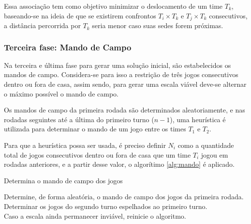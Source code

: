 \documentclass[12pt,a4paper]{article}
\makeatletter
\newcommand{\algorithmfootnote}[2][\footnotesize]{%
	\let\old@algocf@finish\@algocf@finish%
	\def\@algocf@finish{\old@algocf@finish%
		\leavevmode\rlap{\begin{minipage}{\linewidth}
				#1#2
		\end{minipage}}%
	}%
}
\makeatother
\begin{document}
Essa associação tem como objetivo minimizar o deslocamento de um time $T_{k}$, baseando-se na ideia de que se existirem confrontos $T_{i} \times T_{k}$ e $T_{j} \times T_{k}$ consecutivos, a distância percorrida por $T_{k}$ seria menor caso suas sedes forem próximas.

\subsubsection{Terceira fase: Mando de Campo}

Na terceira e última fase para gerar uma solução inicial, são estabelecidos os mandos de campo. Considera-se para isso a restrição de três jogos consecutivos dentro ou fora de casa, assim sendo, para gerar uma escala viável deve-se alternar o máximo possível o mando de campo.

Os mandos de campo da primeira rodada são determinados aleatoriamente, e nas rodadas seguintes até a última do primeiro turno ($n-1$), uma heurística é utilizada para determinar o mando de um jogo entre os times $T_{1}$ e $T_{2}$.

Para que a heurística possa ser usada, é preciso definir $N_{i}$ como a quantidade total de jogos consecutivos dentro ou fora de casa que um time $T_{i}$ jogou em rodadas anteriores, e a partir desse valor, o algorítimo \ref{alg:mando} é aplicado.

\vspace{0.5cm}
\begin{algorithm}[H]
	\caption{Determina o mando de campo dos jogos}
	\algorithmfootnote{Fonte: \citet*{marcio:jogos}}
	\label{alg:mando}
	Determine, de forma aleatória, o mando de campo dos jogos da primeira rodada.\\
	Determinar os jogos do segundo turno espelhados ao primeiro turno.\\
	Caso a escala ainda permanecer inviável, reinicie o algoritmo.
\end{algorithm}
\end{document}
